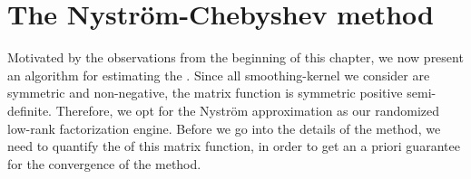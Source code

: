 
\section{The Nystr\"om-Chebyshev method}
\label{sec:3-nystrom-nystrom-chebyshev}

Motivated by the observations from the beginning of this chapter, we now present
an algorithm for estimating the .
Since all \gls{smoothing-kernel} we consider are symmetric
and non-negative, the matrix function  is
symmetric positive semi-definite. Therefore, we opt for the Nystr\"om approximation
as our randomized low-rank factorization engine. Before we go into the details
of the method, we need to quantify the  of this matrix
function, in order to get an a priori guarantee for the convergence of the 
method.\\

